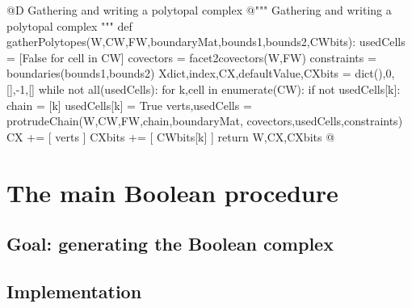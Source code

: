 \documentclass[11pt,oneside]{article}	%
\begin{document}
@D Gathering and writing a polytopal complex
@{""" Gathering and writing a polytopal complex """
def gatherPolytopes(W,CW,FW,boundaryMat,bounds1,bounds2,CWbits):
	usedCells = [False for cell in CW]
	covectors = facet2covectors(W,FW)
	constraints = boundaries(bounds1,bounds2)
	Xdict,index,CX,defaultValue,CXbits = dict(),0,[],-1,[]
	while not all(usedCells):
		for k,cell in enumerate(CW):
			if not usedCells[k]:
				chain = [k]
				usedCells[k] = True
				verts,usedCells = protrudeChain(W,CW,FW,chain,boundaryMat,
									covectors,usedCells,constraints)
				CX += [ verts ]
				CXbits += [ CWbits[k] ]
	return W,CX,CXbits
@}


\section{The main Boolean procedure}

\subsection{Goal: generating the Boolean complex}


\subsection{Implementation}
\end{document}
